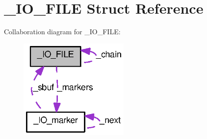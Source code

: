 \section{\_\-IO\_\-FILE Struct Reference}
\label{struct__IO__FILE}


Collaboration diagram for \_\-IO\_\-FILE:
\nopagebreak
\begin{figure}[H]
\begin{center}
\leavevmode
\includegraphics[width=153pt]{struct__IO__FILE__coll__graph}
\end{center}
\end{figure}
